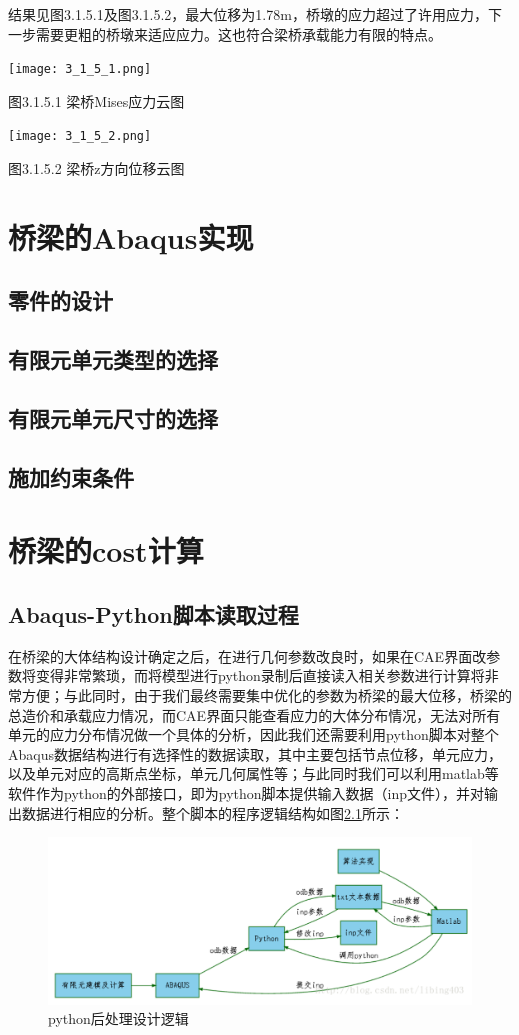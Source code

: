 \documentclass[forprint]{WHUBachelor}
\begin{document}
结果见图3.1.5.1及图3.1.5.2，最大位移为1.78m，桥墩的应力超过了许用应力，下一步需要更粗的桥墩来适应应力。这也符合梁桥承载能力有限的特点。

\texttt{[image: 3\_1\_5\_1.png]}

图3.1.5.1 梁桥Mises应力云图

\texttt{[image: 3\_1\_5\_2.png]}

图3.1.5.2 梁桥z方向位移云图

\chapter{桥梁的Abaqus实现}
\section{零件的设计}
\section{有限元单元类型的选择}
\section{有限元单元尺寸的选择}
\section{施加约束条件}
\chapter{桥梁的cost计算}

\section{Abaqus-Python脚本读取过程}
在桥梁的大体结构设计确定之后，在进行几何参数改良时，如果在CAE界面改参数将变得非常繁琐，而将模型进行python录制后直接读入相关参数进行计算将非常方便；与此同时，由于我们最终需要集中优化的参数为桥梁的最大位移，桥梁的总造价和承载应力情况，而CAE界面只能查看应力的大体分布情况，无法对所有单元的应力分布情况做一个具体的分析，因此我们还需要利用python脚本对整个Abaqus数据结构进行有选择性的数据读取，其中主要包括节点位移，单元应力，以及单元对应的高斯点坐标，单元几何属性等；与此同时我们可以利用matlab等软件作为python的外部接口，即为python脚本提供输入数据（inp文件），并对输出数据进行相应的分析。整个脚本的程序逻辑结构如图\ref{4-1}所示：

\begin{figure}[H]
\centering  
\includegraphics[width = .8\textwidth]{1.png} 
\caption{python后处理设计逻辑} 
\label{4-1} 
\end{figure}
\end{document}
